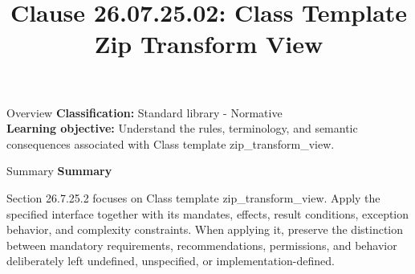 \documentclass[10pt,letterpaper]{article}
\title{Clause 26.07.25.02: Class Template Zip Transform View}
\author{}
\date{}
\begin{document}
\maketitle
\begin{CornellOverviewBox}{Overview}
\textbf{Classification:} Standard library - Normative\\[2pt]
\textbf{Learning objective:} Understand the rules, terminology, and semantic consequences associated with Class template zip\_transform\_view.
\end{CornellOverviewBox}\begin{CornellSummaryBox}{Summary}
{\sffamily\bfseries\color{Accent} Summary}\par\vspace{3pt}Section 26.7.25.2 focuses on Class template zip\_transform\_view. Apply the specified interface together with its mandates, effects, result conditions, exception behavior, and complexity constraints. When applying it, preserve the distinction between mandatory requirements, recommendations, permissions, and behavior deliberately left undefined, unspecified, or implementation-defined.
\end{CornellSummaryBox}
\end{document}

